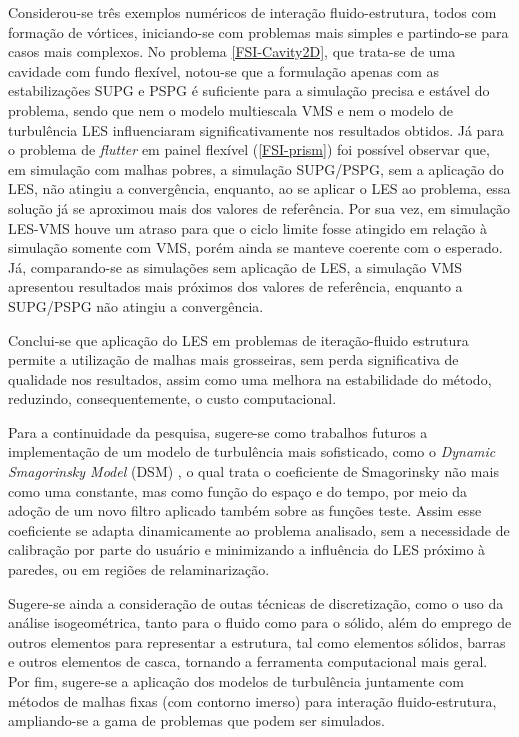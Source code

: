 Considerou-se três exemplos numéricos de interação fluido-estrutura, todos com formação de vórtices, iniciando-se com problemas mais simples e partindo-se para casos mais complexos. No problema \ref{FSI-Cavity2D}, que trata-se de uma cavidade com fundo flexível, notou-se que a formulação apenas com as estabilizações SUPG e PSPG é suficiente para a simulação precisa e estável do problema, sendo que nem o modelo multiescala VMS e nem o modelo de turbulência LES influenciaram  significativamente nos resultados obtidos. Já para o problema de \textit{flutter} em painel flexível (\ref{FSI-prism}) foi possível observar que, em simulação com malhas pobres, a simulação SUPG/PSPG, sem a aplicação do LES, não atingiu a convergência, enquanto, ao se aplicar o LES ao problema, essa solução já se aproximou mais dos valores de referência. Por sua vez, em simulação LES-VMS houve um atraso para que o ciclo limite fosse atingido em relação à simulação somente com VMS, porém ainda se manteve coerente com o esperado. Já, comparando-se as simulações sem aplicação de LES, a simulação VMS apresentou resultados mais próximos dos valores de referência, enquanto a SUPG/PSPG não atingiu a convergência.

Conclui-se que aplicação do LES em problemas de iteração-fluido estrutura permite a utilização de malhas mais grosseiras, sem perda significativa de qualidade nos resultados, assim como uma melhora na estabilidade do método, reduzindo, consequentemente, o custo computacional.

Para a continuidade da pesquisa, sugere-se como trabalhos futuros a implementação de um modelo de turbulência mais sofisticado, como o \textit{Dynamic Smagorinsky Model} (DSM) \cite{germano1991dynamic}, o qual trata o coeficiente de Smagorinsky não mais como uma constante, mas como função do espaço e do tempo, por meio da adoção de um novo filtro aplicado também sobre as funções teste. Assim esse coeficiente se adapta dinamicamente ao problema analisado, sem a necessidade de calibração por parte do usuário e minimizando a influência do LES próximo à paredes, ou em regiões de relaminarização.

Sugere-se ainda a consideração de outas técnicas de discretização, como o uso da análise isogeométrica, tanto para o fluido como para o sólido, além do emprego de outros elementos para representar a estrutura, tal como elementos sólidos, barras e outros elementos de casca, tornando a ferramenta computacional mais geral. Por fim, sugere-se a aplicação dos modelos de turbulência juntamente com métodos de malhas fixas (com contorno imerso) para interação fluido-estrutura, ampliando-se a gama de problemas que podem ser simulados.